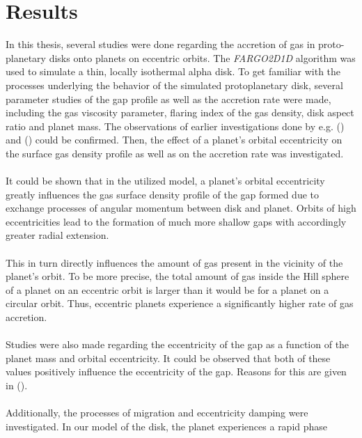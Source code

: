 \chapter{Results}
  In this thesis, several studies were done regarding the accretion of gas 
  in proto-planetary disks onto planets on eccentric orbits. The 
  \textit{FARGO2D1D} algorithm was used to simulate a thin,
  locally isothermal alpha disk.
  To get familiar with the processes underlying the behavior of the simulated 
  protoplanetary disk, several parameter studies of the gap profile as well as 
  the accretion rate were made, including the gas viscosity parameter,
  flaring index of the gas density, disk aspect ratio and planet mass. 
  The observations of earlier investigations done by e.g. 
  \citeauthor{Crida_2006} (\citeyear{Crida_2006}) and 
  \citeauthor{Kley_2006} (\citeyear{Kley_2006}) could be confirmed.
  Then, the effect of a planet's orbital eccentricity on the surface gas 
  density profile as well as on the accretion rate was investigated. \\
  \\
  It could be shown that in the utilized model, a planet's orbital eccentricity 
  greatly influences the 
  gas surface density profile of the gap formed due to exchange processes of 
  angular momentum between disk and planet. Orbits of high eccentricities 
  lead to the formation of much more shallow gaps with accordingly greater 
  radial extension. \\
  \\
  This in turn directly influences the amount of gas present in the vicinity
  of the planet's orbit. To be more precise, the total amount of gas inside 
  the Hill sphere of a planet on an eccentric orbit is larger 
  than it would be for a planet on a circular orbit. 
  Thus, eccentric planets experience a significantly higher rate of gas 
  accretion. \\
  \\
  Studies were also made regarding the eccentricity of the gap as a 
  function of the planet mass and orbital eccentricity. It could be observed 
  that both of these values positively influence the eccentricity of the gap.
  Reasons for this are given in \citeauthor{Hosseinbor_2007}
  (\citeyear{Hosseinbor_2007}).
  \\
  \\
  Additionally, the processes of migration and eccentricity damping were 
  investigated. In our model of the disk, the planet experiences a rapid phase 
